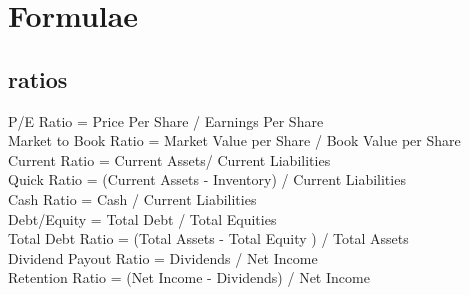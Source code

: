 \section{Formulae}
\subsection*{ratios}
\begin{scriptsize}
P/E Ratio = Price Per Share / Earnings Per Share \\
Market to Book Ratio = Market Value per Share / Book Value per Share \\
Current Ratio = Current Assets/ Current Liabilities \\
Quick Ratio = (Current Assets - Inventory) / Current Liabilities \\
Cash Ratio = Cash / Current Liabilities \\
Debt/Equity = Total Debt / Total Equities \\
Total Debt Ratio = (Total Assets - Total Equity ) / Total Assets \\
Dividend Payout Ratio = Dividends / Net Income \\
Retention Ratio = (Net Income - Dividends) / Net Income \\
\end{scriptsize}
